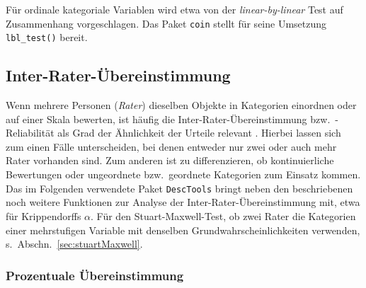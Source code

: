 Für ordinale kategoriale Variablen wird etwa von  der \emph{linear-by-linear} Test auf Zusammenhang vorgeschlagen. Das Paket \lstinline!coin! stellt für seine Umsetzung \lstinline!lbl_test()! bereit.

\subsection{Inter-Rater-Übereinstimmung}
\label{sec:irr}

Wenn mehrere Personen (\emph{Rater}) dieselben Objekte in Kategorien einordnen oder auf einer Skala bewerten, ist häufig die Inter-Rater-Übereinstimmung bzw.\ -Reliabilität als Grad der Ähnlichkeit der Urteile relevant \cite{Wirtz2002}. Hierbei lassen sich zum einen Fälle unterscheiden, bei denen entweder nur zwei oder auch mehr Rater vorhanden sind. Zum anderen ist zu differenzieren, ob kontinuierliche Bewertungen oder ungeordnete bzw.\ geordnete Kategorien zum Einsatz kommen. Das im Folgenden verwendete Paket \lstinline!DescTools! bringt neben den beschriebenen noch weitere Funktionen zur Analyse der Inter-Rater-Übereinstimmung mit, etwa für Krippendorffs $\alpha$. Für den Stuart-Maxwell-Test, ob zwei Rater die Kategorien einer mehrstufigen Variable mit denselben Grundwahrscheinlichkeiten verwenden, s.\ Abschn.\ \ref{sec:stuartMaxwell}.

\subsubsection{Prozentuale Übereinstimmung}

